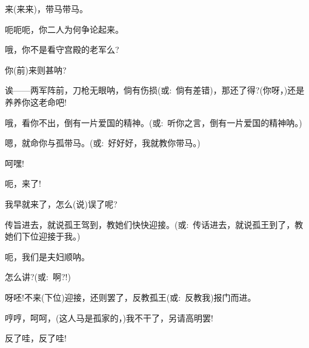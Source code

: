 {来(来来)，带马带马。

呃呃呃，你二人为何争论起来。

哦，你不是看守宫殿的老军么?

你(前)来则甚呐?

诶------两军阵前，刀枪无眼呐，倘有伤损({\akai 或}:~倘有差错)，那还了得?(你呀，)还是养养你这老命吧!

哦，看你不出，倒有一片爱国的精神。({\akai 或}:~听你之言，倒有一片爱国的精神呐。)

嗯，就命你与孤带马。({\akai 或}:~好好好，我就教你带马。)

\vspace{5pt}


呵嘿!\hspace{30pt}~


呃，来了!\hspace{10pt}~

我早就来了，怎么(说)误了呢?

传旨进去，就说孤王驾到，教她们快快迎接。({\akai 或}:~传话进去，就说孤王到了，教她们下位迎接于我。)

呃，我们是夫妇顺呐。

怎么讲?({\akai 或}:~啊?!)

呀呸!不来(下位)迎接，还则罢了，反教孤王({\akai 或}:~反教我)报门而进。

哼哼，呵呵，(这人马是孤家的，)我不干了，另请高明罢!

反了哇，反了哇!





}

